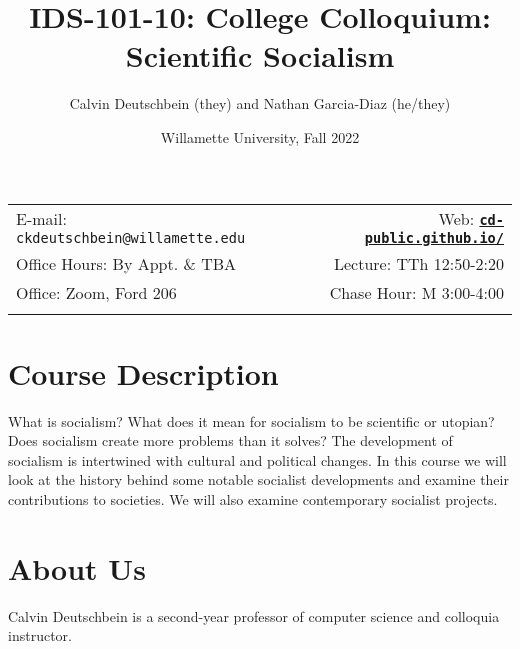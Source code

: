 \documentclass[11pt]{article}
\title{IDS-101-10: College Colloquium: Scientific Socialism}
\author{Calvin Deutschbein (they) and Nathan Garcia-Diaz (he/they)}
\date{Willamette University, Fall 2022}
\newcommand{\blankline}{\quad\pagebreak[2]}
\begin{document}
\maketitle

\blankline

\begin{tabular*}{.93\textwidth}{@{\extracolsep{\fill}}lr}


E-mail: \texttt{ckdeutschbein@willamette.edu} & Web: \href{https://cd-public.github.io/courses/soc}{\tt\bf cd-public.github.io/}  \\

 Office Hours: By Appt. \& TBA  &  Lecture: TTh 12:50-2:20 \\

 Office: Zoom, Ford 206 & Chase Hour: M 3:00-4:00  \\
 & \\
\hline
\end{tabular*}

\vspace{5 mm}


\section*{Course Description}

What is socialism? What does it mean for socialism to be scientific or utopian? Does socialism create more problems than it solves? The development of socialism is intertwined with cultural and political changes. In this course we will look at the history behind some notable socialist developments and examine their contributions to societies. We will also examine contemporary socialist projects.

\section*{About Us}
Calvin Deutschbein is a %
second-year professor of computer science and colloquia instructor.
\end{document}
